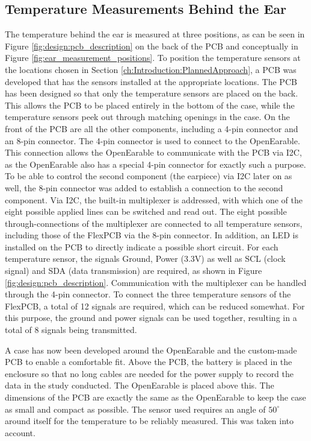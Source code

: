 \subsection{Temperature Measurements Behind the Ear}
\label{ch:Design:Prototype:BehindEar}

The temperature behind the ear is measured at three positions, as can be seen in Figure \ref{fig:design:pcb_description} on the back of the PCB and conceptually in Figure \ref{fig:ear_measurement_positions}.
To position the temperature sensors at the locations chosen in Section \ref{ch:Introduction:PlannedApproach}, a PCB was developed that has the sensors installed at the appropriate locations. 
The PCB has been designed so that only the temperature sensors are placed on the back. This allows the PCB to be placed entirely in the bottom of the case, while the temperature sensors peek out through matching openings in the case. On the front of the PCB are all the other components, including a 4-pin connector and an 8-pin connector.
The 4-pin connector is used to connect to the OpenEarable. This connection allows the OpenEarable to communicate with the PCB via I2C, as the OpenEarable also has a special 4-pin connector for exactly such a purpose.
To be able to control the second component (the earpiece) via I2C later on as well, the 8-pin connector was added to establish a connection to the second component.
Via I2C, the built-in multiplexer is addressed, with which one of the eight possible applied lines can be switched and read out. The eight possible through-connections of the multiplexer are connected to all temperature sensors, including those of the FlexPCB via the 8-pin connector.
In addition, an LED is installed on the PCB to directly indicate a possible short circuit.
For each temperature sensor, the signals Ground, Power (3.3V) as well as SCL (clock signal) and SDA (data transmission) are required, as shown in Figure \ref{fig:design:pcb_description}. Communication with the multiplexer can be handled through the 4-pin connector.
To connect the three temperature sensors of the FlexPCB, a total of 12 signals are required, which can be reduced somewhat. For this purpose, the ground and power signals can be used together, resulting in a total of 8 signals being transmitted.

A case has now been developed around the OpenEarable and the custom-made PCB to enable a comfortable fit.
Above the PCB, the battery is placed in the enclosure so that no long cables are needed for the power supply to record the data in the study conducted.
The OpenEarable is placed above this.
The dimensions of the PCB are exactly the same as the OpenEarable to keep the case as small and compact as possible.
The sensor used requires an angle of $ 50 ^ \circ$ around itself for the temperature to be reliably measured. 
This was taken into account.

